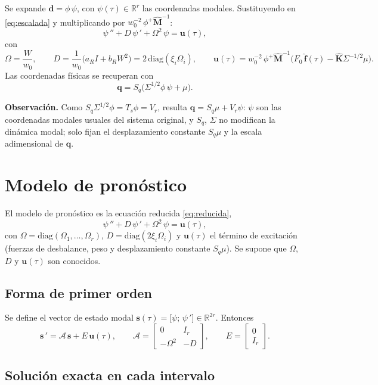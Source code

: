 Se expande $\mathbf d=\phi\,\psi$, con $\psi(\tau)\in\mathbb R^r$ las coordenadas modales. Sustituyendo en 
\eqref{eq:escalada} y multiplicando por $w_0^{-2}\,\phi^{+}\hat{\mathbf M}^{-1}$:
\begin{equation}\label{eq:reducida}
\psi\,''+D\,\psi\,'+\Omega^2\,\psi=\mathbf u(\tau),
\end{equation}
con
\[
\Omega=\frac{W}{w_0},\qquad
D=\frac{1}{w_0}\big(a_RI+b_RW^2\big)=2\,\mathrm{diag}(\xi_i\Omega_i),\qquad
\mathbf u(\tau)=w_0^{-2}\,\phi^{+}\hat{\mathbf M}^{-1}\Big(F_0\,\hat{\mathbf f}(\tau)-\hat{\mathbf K}\Sigma^{-1/2}\mu\Big).
\]
Las coordenadas físicas se recuperan con
\[
\mathbf q=S_q\big(\Sigma^{1/2}\phi\,\psi+\mu\big).
\]

\textbf{Observación.} Como $S_q\Sigma^{1/2}\phi=T_s\phi=V_r$, resulta $\mathbf q=S_q\mu+V_r\psi$: $\psi$ son las coordenadas
modales usuales del sistema original, y $S_q$, $\Sigma$ no modifican la dinámica modal; solo fijan el desplazamiento constante
$S_q\mu$ y la escala adimensional de $\hat{\mathbf q}$.

\section{Modelo de pronóstico}

El modelo de pronóstico es la ecuación reducida \eqref{eq:reducida},
\[
\psi\,''+D\,\psi\,'+\Omega^2\,\psi=\mathbf u(\tau),
\]
con $\Omega=\mathrm{diag}(\Omega_1,\ldots,\Omega_r)$, $D=\mathrm{diag}(2\xi_i\Omega_i)$ y $\mathbf u(\tau)$ el término de excitación (fuerzas de desbalance, peso y desplazamiento constante $S_q\mu$). Se supone que $\Omega$, $D$ y $\mathbf u(\tau)$ son conocidos.

\subsection{Forma de primer orden}

Se define el vector de estado modal $\mathbf s(\tau)=\big[\psi;\,\psi\,'\big]\in\mathbb R^{2r}$. Entonces
\[
\mathbf s\,'=\mathcal A\,\mathbf s+E\,\mathbf u(\tau),\qquad
\mathcal A=\begin{bmatrix}0&I_r\\-\Omega^2&-D\end{bmatrix},\qquad
E=\begin{bmatrix}0\\I_r\end{bmatrix}.
\]

\subsection{Solución exacta en cada intervalo}

